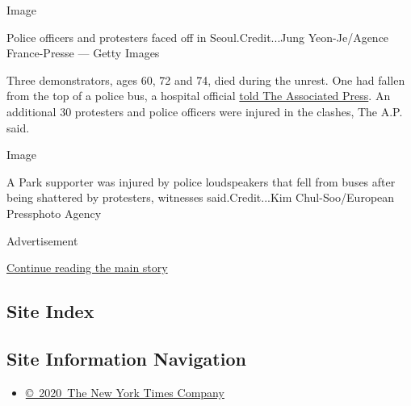 Image

Police officers and protesters faced off in Seoul.Credit...Jung
Yeon-Je/Agence France-Presse --- Getty Images

Three demonstrators, ages 60, 72 and 74, died during the unrest. One had
fallen from the top of a police bus, a hospital official
\href{http://bigstory.ap.org/article/dbfcdb68025249cab330f5b33e2d1929/south-koreas-president-formally-ousted-court}{told
The Associated Press}. An additional 30 protesters and police officers
were injured in the clashes, The A.P. said.

Image

A Park supporter was injured by police loudspeakers that fell from buses
after being shattered by protesters, witnesses said.Credit...Kim
Chul-Soo/European Pressphoto Agency

Advertisement

\protect\hyperlink{after-bottom}{Continue reading the main story}

\hypertarget{site-index}{%
\subsection{Site Index}\label{site-index}}

\hypertarget{site-information-navigation}{%
\subsection{Site Information
Navigation}\label{site-information-navigation}}

\begin{itemize}
\tightlist
\item
  \href{https://help.nytimes3xbfgragh.onion/hc/en-us/articles/115014792127-Copyright-notice}{©~2020~The
  New York Times Company}
\end{itemize}

